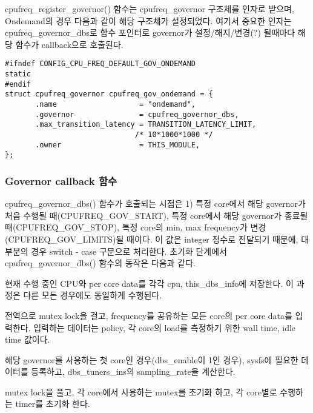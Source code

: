 cpufreq\_register\_governor() 함수는 cpufreq\_governor 구조체를 인자로 받으며, Ondemand의 경우 다음과 같이 해당 구조체가 설정되었다. 
여기서 중요한 인자는 cpufreq\_governor\_dbs로 함수 포인터로 governor가 설정/해지/변경(?) 될때마다 해당 함수가 callback으로 호출된다. 
\begin{lstlisting}
#ifndef CONFIG_CPU_FREQ_DEFAULT_GOV_ONDEMAND
static
#endif
struct cpufreq_governor cpufreq_gov_ondemand = {
       .name                   = "ondemand",
       .governor               = cpufreq_governor_dbs,
       .max_transition_latency = TRANSITION_LATENCY_LIMIT,  
                              /* 10*1000*1000 */
       .owner                  = THIS_MODULE,
};
\end{lstlisting}


\subsubsection{Governor callback 함수}

cpufreq\_governor\_dbs() 함수가 호출되는 시점은 1) 특정 core에서 해당 governor가 처음 수행될 때(CPUFREQ\_GOV\_START), 특정 core에서 해당 governor가 종료될 때(CPUFREQ\_GOV\_STOP), 특정 core의 min, max frequency가 변경(CPUFREQ\_GOV\_LIMITS)될 때이다. 
이 값은 integer 정수로 전달되기 때문에, 대부분의 경우 switch - case 구문으로 처리한다. 
초기화 단계에서 cpufreq\_governor\_dbs() 함수의 동작은 다음과 같다. 
\vspace{\baselineskip}  %
\begin{compactenum}
\item 현재 수행 중인 CPU와 per core data를 각각 cpu, this\_dbs\_info에 저장한다. 이 과정은 다른 모든 경우에도 동일하게 수행된다.
\item 전역으로 mutex lock을 걸고, frequency를 공유하는 모든 core의 per core data를 입력한다. 
입력하는 데이터는 policy, 각 core의 load를 측정하기 위한 wall time, idle time 값이다. 
\item 해당 governor를 사용하는 첫 core인 경우(dbs\_enable이 1인 경우), sysfs에 필요한 데이터를 등록하고, 
dbs\_tuners\_ins의 sampling\_rate을 계산한다. 
\item mutex lock을 풀고, 각 core에서 사용하는 mutex를 초기화 하고, 각 core별로 수행하는 timer를 초기화 한다.
\end{compactenum}

